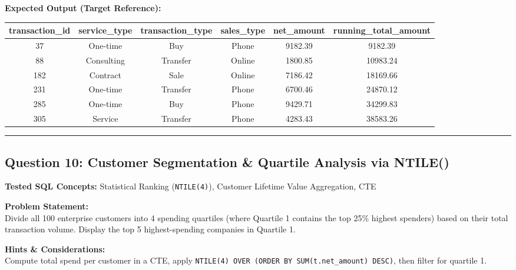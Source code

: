 \documentclass[11pt,a4paper]{article}
\begin{document}
\vspace{0.3cm}
\noindent\textbf{Expected Output (Target Reference):}
\begin{center}
\small
\begin{tabular}{cccccc}
\toprule
\textbf{transaction\_id} & \textbf{service\_type} & \textbf{transaction\_type} & \textbf{sales\_type} & \textbf{net\_amount} & \textbf{running\_total\_amount} \\
\midrule
37 & One-time & Buy & Phone & 9182.39 & 9182.39 \\
88 & Consulting & Transfer & Online & 1800.85 & 10983.24 \\
182 & Contract & Sale & Online & 7186.42 & 18169.66 \\
231 & One-time & Transfer & Phone & 6700.46 & 24870.12 \\
285 & One-time & Buy & Phone & 9429.71 & 34299.83 \\
305 & Service & Transfer & Phone & 4283.43 & 38583.26 \\
\bottomrule
\end{tabular}
\end{center}

\vspace{0.4cm}
\noindent\rule{\textwidth}{0.4pt}
\vspace{0.4cm}

\subsection*{Question 10: Customer Segmentation & Quartile Analysis via NTILE()}

\noindent\textbf{Tested SQL Concepts:} Statistical Ranking (\texttt{NTILE(4)}), Customer Lifetime Value Aggregation, CTE

\vspace{0.15cm}
\noindent\textbf{Problem Statement:} \\
Divide all 100 enterprise customers into 4 spending quartiles (where Quartile 1 contains the top 25\% highest spenders) based on their total transaction volume. Display the top 5 highest-spending companies in Quartile 1.

\vspace{0.2cm}
\noindent\textbf{Hints \& Considerations:} \\
Compute total spend per customer in a CTE, apply \texttt{NTILE(4) OVER (ORDER BY SUM(t.net\_amount) DESC)}, then filter for quartile 1.
\end{document}
